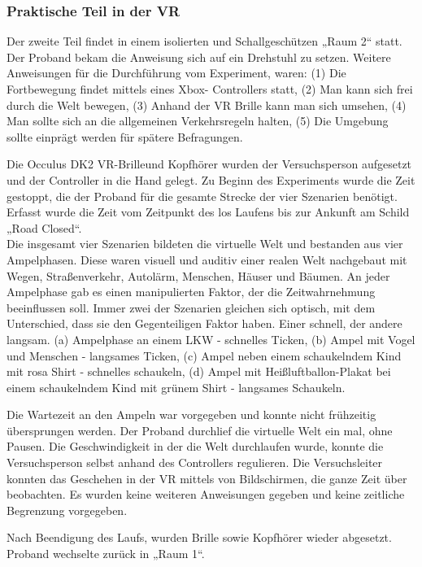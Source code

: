 \documentclass{Paper}
\begin{document}
\subsubsection{Praktische Teil in der VR}
Der zweite Teil findet in einem isolierten und Schallgeschützen „Raum 2“ statt. Der Proband
bekam die Anweisung sich auf ein Drehstuhl zu setzen. Weitere Anweisungen für die
Durchführung vom Experiment, waren: (1) Die Fortbewegung findet mittels eines Xbox-
Controllers statt, (2) Man kann sich frei durch die Welt bewegen, (3) Anhand der VR Brille
kann man sich umsehen, (4) Man sollte sich an die allgemeinen Verkehrsregeln halten, (5)
Die Umgebung sollte einprägt werden für spätere Befragungen.
\par
Die Occulus DK2 VR-Brilleund Kopfhörer wurden der Versuchsperson aufgesetzt und der Controller in die Hand 
gelegt. Zu Beginn des Experiments wurde die Zeit gestoppt, die der Proband für die
gesamte Strecke der vier Szenarien benötigt. Erfasst wurde die Zeit vom Zeitpunkt des los
Laufens bis zur Ankunft am Schild „Road Closed“. \\
Die insgesamt vier Szenarien bildeten die
virtuelle Welt und bestanden aus vier Ampelphasen. Diese waren visuell und auditiv einer
realen Welt nachgebaut mit Wegen, Straßenverkehr, Autolärm, Menschen, Häuser und
Bäumen. An jeder Ampelphase gab es einen manipulierten Faktor, der die
Zeitwahrnehmung beeinflussen soll. Immer zwei der Szenarien gleichen sich optisch, mit
dem Unterschied, dass sie den Gegenteiligen Faktor haben. Einer schnell, der andere
langsam. (a) Ampelphase an einem LKW - schnelles Ticken, (b) Ampel mit Vogel und
Menschen - langsames Ticken, (c) Ampel neben einem schaukelndem Kind mit rosa Shirt -
schnelles schaukeln, (d) Ampel mit Heißluftballon-Plakat bei einem schaukelndem Kind mit
grünem Shirt - langsames Schaukeln.
\par
Die Wartezeit an den Ampeln war vorgegeben und konnte nicht frühzeitig übersprungen werden. Der Proband durchlief die virtuelle Welt ein
mal, ohne Pausen. Die Geschwindigkeit in der die Welt durchlaufen wurde, konnte die
Versuchsperson selbst anhand des Controllers regulieren. Die Versuchsleiter konnten das
Geschehen in der VR mittels von Bildschirmen, die ganze Zeit über beobachten. Es wurden
keine weiteren Anweisungen gegeben und keine zeitliche Begrenzung vorgegeben. 
\par
Nach Beendigung des Laufs, wurden Brille sowie Kopfhörer wieder abgesetzt. Proband wechselte
zurück in „Raum 1“.
\end{document}
